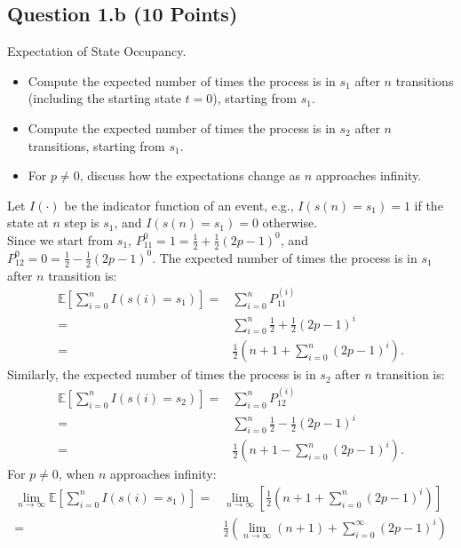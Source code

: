 \documentclass[12pt]{article}
\begin{document}
\subsection*{Question 1.b (10 Points)} Expectation of State Occupancy.
    \begin{itemize}
        \item Compute the expected number of times the process is in $s_1$ after $n$ transitions (including the starting state $t=0$), starting from $s_1$. 
        \item Compute the expected number of times the process is in $s_2$ after $n$ transitions, starting from $s_1$.
        \item For $p \ne 0$, discuss how the expectations change as 
$n$ approaches infinity.
    \end{itemize}
\begin{solution}
Let $I(\cdot)$ be the indicator function of an event, e.g., $I(s(n)=s_1) = 1$ if the state at $n$ step is $s_1$, and $I(s(n)=s_1) = 0$ otherwise. \\
Since we start from $s_1$, $P^{0}_{11} = 1 = \frac{1}{2} + \frac{1}{2}(2p - 1)^{0}$, and $P^{0}_{12} = 0 = \frac{1}{2} - \frac{1}{2}(2p - 1)^{0}$.
The expected number of times the process is in $s_1$ after $n$ transition is:
\begin{align}
    \mathbb{E}[\sum_{i=0}^{n}I(s(i)=s_1)] 
    = & \sum_{i=0}^{n} P^{(i)}_{11} \\
    = & \sum_{i=0}^{n} \frac{1}{2} + \frac{1}{2}(2p - 1)^{i} \\
    = & \frac{1}{2}\left(n + 1 + \sum_{i=0}^{n}(2p - 1)^{i}\right).
\end{align}
Similarly, the expected number of times the process is in $s_2$ after $n$ transition is:
\begin{align}
    \mathbb{E}[\sum_{i=0}^{n}I(s(i)=s_2)] 
    = & \sum_{i=0}^{n} P^{(i)}_{12} \\
    = & \sum_{i=0}^{n} \frac{1}{2} - \frac{1}{2}(2p - 1)^{i} \\
    = & \frac{1}{2}\left(n + 1 - \sum_{i=0}^{n}(2p - 1)^{i}\right).
\end{align}
For $p\neq 0$, when $n$ approaches infinity:
\begin{align}
    \lim_{n\rightarrow \infty}\mathbb{E}[\sum_{i=0}^{n}I(s(i)=s_1)] 
    = & \lim_{n\rightarrow \infty} \left[ \frac{1}{2}\left(n + 1 + \sum_{i=0}^{n}(2p - 1)^{i}\right) \right] \\
    = & \frac{1}{2}\left(\lim_{n\rightarrow \infty}(n + 1) + \sum_{i=0}^{\infty}(2p - 1)^{i}\right) \\

\end{align}
\end{solution}
\end{document}
